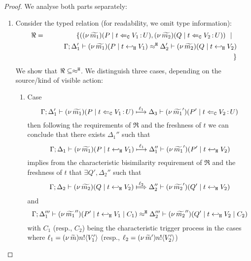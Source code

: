 \begin{proof}
We analyse both parts separately:
	\begin{enumerate}[1.]
		\item  Consider the typed relation (for readability, we omit type information):
				\begin{eqnarray*}
					\Re	&=&		\{	((\nu\, \widetilde{m_1})(P \;|\; t \Leftarrow_{\mathtt{C}} V_1{\,:\,}U ),
										(\nu\, \widetilde{m_2})(Q \;|\; t \Leftarrow_{\mathtt{C}} V_2{\,:\,}U))
								\ \ |\ \ \\
						&&		\qquad	\Gamma; \Delta_1' \vdash (\nu\, \widetilde{m_1})(P \;|\; t \hookleftarrow_{\mathtt{H}} V_1) \approx^\mathtt{H} \Delta_2' \vdash (\nu\, \widetilde{m_2})(Q \;|\; t \hookleftarrow_{\mathtt{H}} V_2)
						\\
						&&		\}
				\end{eqnarray*}
				We show that $\Re \subseteq \approx^\mathtt{H}$.
				We distinguish three cases, depending on the source/kind of visible action: 
				\begin{enumerate}
					\item	Case
						\[
							\Gamma; \Delta_1' \vdash (\nu\, \widetilde{m_1})(P \;|\; t \Leftarrow_{\mathtt{C}} V_1{\,:\,}U ) \stackrel{\ell_1}{\longmapsto} \Delta_3 \vdash{(\nu\, \widetilde{m_1}')(P' \;|\;t \Leftarrow_{\mathtt{C}} V_2{\,:\,}U )}
						\]
							then following the requirements of $\Re$ and the freshness of $t$
							we can conclude that there exists $\Delta_1''$ such that
						\[
							\Gamma; \Delta_1 \vdash (\nu\, \widetilde{m_1})(P \;|\; t \hookleftarrow_{\mathtt{H}} V_1) \stackrel{\ell_1}{\longmapsto} \Delta_1'' \vdash (\nu\, \widetilde{m_1}')(P' \;|\; t \hookleftarrow_{\mathtt{H}} V_2)
						\]
							implies from the characteristic bisimilarity requirement of $\Re$ and
							the freshness of $t$ that $\exists Q', \Delta_2''$ such that
						\begin{eqnarray}
							\horel{\Gamma}{\Delta_2}{\newsp{\widetilde{m_2}}{Q \Par \htrigger{t}{V_2}}}
							{\Hby{\ell_2}}
							{\Delta_2''}{\newsp{\widetilde{m_2}'}{Q' \Par \htrigger{t}{V_2}}}
							\label{proof:trig_equiv00}
						\end{eqnarray}
							and
						\begin{eqnarray}
							\Gamma; \Delta_1''' \vdash (\nu\, \widetilde{m_1}'')(P' \;|\; t \hookleftarrow_{\mathtt{H}} V_1 \;|\; C_1) \approx^\mathtt{H} \Delta_2''' \vdash (\nu\, \widetilde{m_2}'')(Q' \;|\; t \hookleftarrow_{\mathtt{H}} V_2 \;|\; C_2)
							\label{proof:trig_equiv11}
						\end{eqnarray}
							with $C_1$ (resp., $C_2$) being the characteristic trigger process
							in the cases where $\ell_1 = (\nu\, \widetilde{m}) n ! \langle V_1' \rangle$ (resp., $\ell_2 = (\nu\, \widetilde{m}') n ! \langle V_2' \rangle$)

\end{enumerate}
\end{enumerate}
\end{proof}
